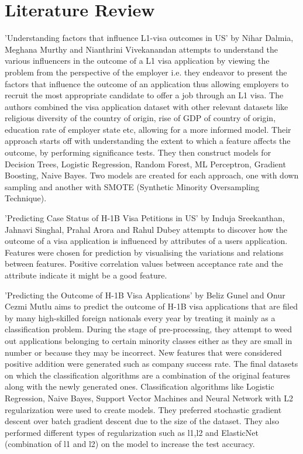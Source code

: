 \documentclass[conference]{IEEEtran}
\begin{document}
\section{Literature Review}
'Understanding factors that influence L1-visa outcomes in US' by Nihar Dalmia, Meghana Murthy and Nianthrini Vivekanandan \cite{berk}attempts to understand the various influencers in the outcome of a L1 visa application by viewing the problem from the perspective of the employer i.e. they endeavor to present the factors that influence the outcome of an application thus allowing employers to recruit the most appropriate candidate to offer a job through an L1 visa. The authors combined the visa application dataset with other relevant datasets like religious diversity of the country of origin, rise of GDP of country of origin, education rate of employer state etc, allowing for a more informed model. Their approach starts off with understanding the extent to which a feature affects the outcome, by performing significance tests. They then construct models for Decision Trees, Logistic Regression, Random Forest, ML Perceptron, Gradient Boosting, Naive Bayes. Two models are created for each approach, one with down sampling and another with SMOTE (Synthetic Minority Oversampling Technique).

'Predicting Case Status of H-1B Visa Petitions in US' by Induja Sreekanthan, Jahnavi Singhal, Prahal Arora and Rahul Dubey attempts to discover how the outcome of a visa application is influenced by attributes of a users application. Features were chosen for prediction by visualising the variations and relations between features. Positive correlation values between acceptance rate and the attribute indicate it might be a good feature.

'Predicting the Outcome of H-1B Visa Applications' by Beliz Gunel and Onur Cezmi Mutlu \cite{stanford}aims to predict the outcome of H-1B visa applications that are filed by many high-skilled foreign nationals every year by treating it mainly as a classification problem. During the stage of pre-processing, they attempt to weed out applications belonging to certain minority classes either as they are small in number or because they may be incorrect. New features that were considered positive addition were generated such as company success rate. The final datasets on which the classification algorithms are a combination of the original features along with the newly generated ones. Classification algorithms like Logistic Regression, Naive Bayes, Support Vector Machines and Neural Network with L2 regularization were used to create models. They preferred stochastic gradient descent over batch gradient descent due to the size of the dataset. They also performed different types of regularization such as l1,l2 and ElasticNet (combination of l1 and l2) on the model to increase the test accuracy. 
\end{document}
